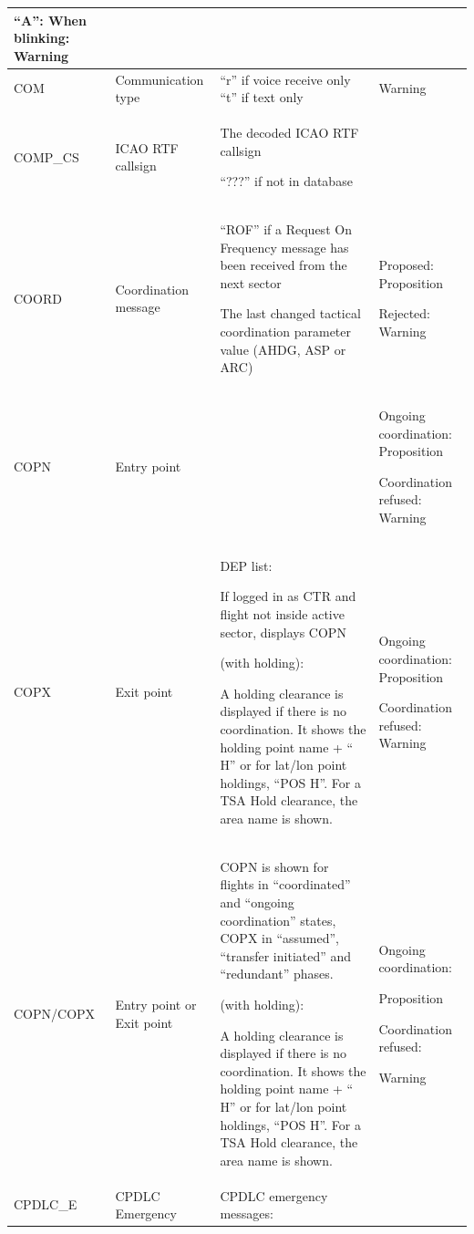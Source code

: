 \documentclass[11pt,a4paper]{memoir}
\begin{document}
\begin{longtable}{|p{2.5cm}|p{2.5cm}|p{4.5cm}|p{4.5cm}|}
      \bigskip
      
      “A”: When blinking: Warning \\ \hline
    COM &
      Communication type &
      “r” if voice receive only “t” if text only &
      Warning \\ \hline
    COMP\_CS &
      ICAO RTF callsign &
      The decoded ICAO RTF callsign 
      
      “???” if not in database &
       \\ \hline
    COORD &
      Coordination message &
      “ROF” if a Request On Frequency message has been received from  the next sector  
      \bigskip

      The last changed tactical coordination parameter value (AHDG, ASP or ARC) &
      Proposed: Proposition 
      
      Rejected: Warning \\ \hline
    COPN &
      Entry point &
       &
      Ongoing coordination:  Proposition 
      
      Coordination refused: Warning \\ \hline
    COPX &
      Exit point &
      DEP list: 
      
      If logged in as CTR and flight not inside active sector, displays COPN 
      \bigskip

      (with holding): 
      
      A holding clearance is displayed if  there is no coordination. It shows  the holding point name + “ H” or for  lat/lon point holdings, “POS H”. For a TSA Hold clearance, the area  name is shown. &
      Ongoing coordination: Proposition 
      
      Coordination refused: Warning \\ \hline
    COPN/COPX &
      Entry point or Exit point &
      COPN is shown for flights in  “coordinated” and “ongoing coordination” states, COPX in “assumed”, “transfer  initiated” and “redundant” phases. 
      \bigskip

      (with holding): 
      
      A holding clearance is displayed if  there is no coordination. It shows  the holding point name + “ H” or for  lat/lon point holdings, “POS H”. For a TSA Hold clearance, the area  name is shown. &
      Ongoing coordination: 
      
      Proposition 
      \bigskip
      
      Coordination refused: 
      
      Warning \\ \hline
    CPDLC\_E &
      CPDLC Emergency &
      CPDLC emergency messages: 
      

\end{longtable}
\end{document}
